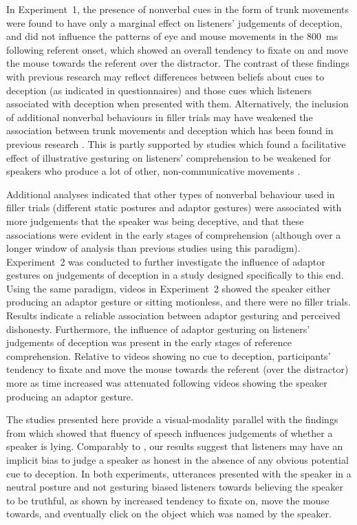 \documentclass[a4paper,man,natbib]{apa6}
\begin{document}
In Experiment~1, the presence of nonverbal cues in the form of trunk movements were found to have only a marginal effect on listeners' judgements of deception, and did not influence the patterns of eye  and mouse movements in the 800~ms following referent onset, which showed an overall tendency to fixate on and move the mouse towards the referent over the distractor.
The contrast of these findings with previous research \citep[e.g.][]{Vrij1996a} may reflect differences between beliefs about cues to deception (as indicated in questionnaires) and those cues which listeners associated with deception when presented with them.
Alternatively, the inclusion of additional nonverbal behaviours in filler trials may have weakened the association between trunk movements and deception which has been found in previous research \citep[e.g][]{Vrij1996a, Zuckerman1981}.
This is partly supported by studies which found a facilitative effect of illustrative gesturing on listeners' comprehension to be weakened for speakers who produce a lot of other, non-communicative movements \citep{Holle2007}. 

Additional analyses indicated that other types of nonverbal behaviour used in filler trials (different static postures and adaptor gestures) were associated with more judgements that the speaker was being deceptive, and that these associations were evident in the early stages of comprehension (although over a longer window of analysis than previous studies using this paradigm).
Experiment~2 was conducted to further investigate the influence of adaptor gestures on judgements of deception in a study designed specifically to this end. %
Using the same paradigm, videos in Experiment~2 showed the speaker either producing an adaptor gesture or sitting motionless, and there were no filler trials. 
Results indicate a reliable association between adaptor gesturing and perceived dishonesty.
Furthermore, the influence of adaptor gesturing on listeners' judgements of deception was present in the early stages of reference comprehension.
Relative to videos showing no cue to deception, participants' tendency to fixate and move the mouse towards the referent (over the distractor) more as time increased was attenuated following videos showing the speaker producing an adaptor gesture.

The studies presented here provide a visual-modality parallel with the findings from \citet{Loy2017} which showed that fluency of speech influences judgements of whether a speaker is lying.
Comparably to \citet{Loy2017}, our results suggest that listeners may have an implicit bias to judge a speaker as honest in the absence of any obvious potential cue to deception.
In both experiments, utterances presented with the speaker in a neutral posture and not gesturing biased listeners towards believing the speaker to be truthful, as shown by increased tendency to fixate on, move the mouse towards, and eventually click on the object which was named by the speaker. 
\end{document}
